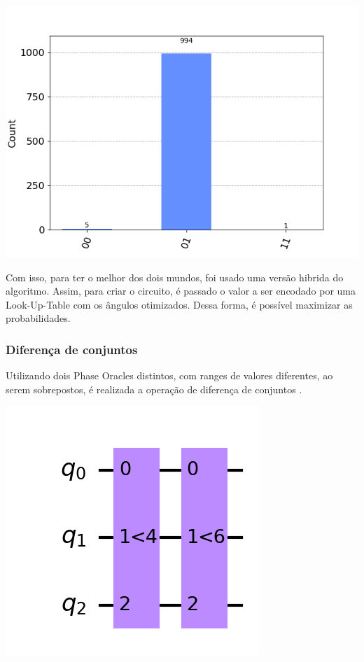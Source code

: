 \documentclass{article}
\begin{document}
\begin{center}
	\includegraphics[scale=0.5]{new_grover_for_1_bit_strings_l2_outcomes.png}
	\label{fig:l2-grover-new-outcomes}
\end{center}



Com isso, para ter o melhor dos dois mundos, foi usado uma versão hibrida do algoritmo. Assim, para criar o circuito, é passado o valor a ser encodado por uma Look-Up-Table com os ângulos otimizados. Dessa forma, é possível maximizar as probabilidades.

\subsubsection{Diferença de conjuntos}

Utilizando dois Phase Oracles distintos, com ranges de valores diferentes, ao serem sobrepostos, é realizada a operação de diferença de conjuntos \cite{sanchezrivero2023initial}.

\begin{center}
	\includegraphics[scale=0.3]{less_than.png}
	\label{fig:less-than-circuit}
\end{center}
\end{document}
